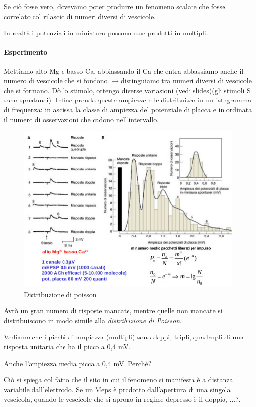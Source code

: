 \documentclass[a4paper,12pt]{article}
\newcommand{\lfreccia}{\ensuremath{\longrightarrow}}
\begin{document}
Se ciò fosse vero, dovevamo poter produrre un fenomeno scalare che fosse correlato col rilascio di numeri diversi di vescicole. 

In realtà i potenziali in miniatura possono esse prodotti in multipli.
\paragraph{Esperimento}
Mettiamo alto Mg e basso Ca, abbiassando il Ca che entra abbassiamo anche il numero di vescicole che si fondono \lfreccia distinguiamo tra numeri diversi di vescicole che si formano. Dò lo stimolo, ottengo diverse variazioni (vedi slides)(gli stimoli S sono spontanei). Infine prendo queste ampiezze e le distribuisco in un istogramma di frequenza: in ascissa la classe di ampiezza del potenziale di placca e in ordinata il numero di osservazioni che cadono nell'intervallo.

\begin{figure}[H]
\centering
\includegraphics[scale=0.6]{immagine/poisson.jpg}
\caption{Distribuzione di poisson}
\end{figure}

 Avrò un gran numero di risposte mancate, mentre quelle non mancate si distribuiscono in modo simile alla \emph{distribuzione di Poisson}. 

Vediamo che i picchi di ampiezza (multipli) sono doppi, tripli, quadrupli di una risposta unitaria che ha il picco a 0,4 mV.

Anche l'ampiezza media picca a 0,4 mV. Perchè?

Ciò si spiega col fatto che il sito in cui il fenomeno si manifesta è a distanza variabile dall'elettrodo. Se un Meps è prodotto dall'apertura di una singola vescicola, quando le vescicole che si aprono in regime depresso è il doppio, ...?.
\end{document}
